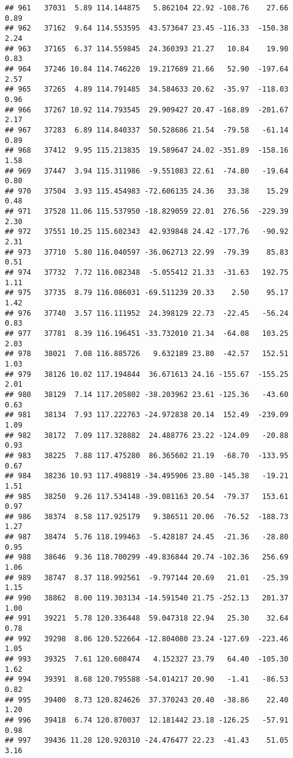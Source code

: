 \documentclass[]{article}
\begin{document}
\begin{verbatim}
## 961   37031  5.89 114.144875   5.862104 22.92 -108.76    27.66  0.89
## 962   37162  9.64 114.553595  43.573647 23.45 -116.33  -150.38  2.24
## 963   37165  6.37 114.559845  24.360393 21.27   10.84    19.90  0.83
## 964   37246 10.84 114.746220  19.217689 21.66   52.90  -197.64  2.57
## 965   37265  4.89 114.791485  34.584633 20.62  -35.97  -118.03  0.96
## 966   37267 10.92 114.793545  29.909427 20.47 -168.89  -201.67  2.17
## 967   37283  6.89 114.840337  50.528686 21.54  -79.58   -61.14  0.89
## 968   37412  9.95 115.213835  19.589647 24.02 -351.89  -158.16  1.58
## 969   37447  3.94 115.311986  -9.551083 22.61  -74.80   -19.64  0.80
## 970   37504  3.93 115.454983 -72.606135 24.36   33.38    15.29  0.48
## 971   37528 11.06 115.537950 -18.829059 22.01  276.56  -229.39  2.30
## 972   37551 10.25 115.602343  42.939848 24.42 -177.76   -90.92  2.31
## 973   37710  5.80 116.040597 -36.062713 22.99  -79.39    85.83  0.51
## 974   37732  7.72 116.082348  -5.055412 21.33  -31.63   192.75  1.11
## 975   37735  8.79 116.086031 -69.511239 20.33    2.50    95.17  1.42
## 976   37740  3.57 116.111952  24.398129 22.73  -22.45   -56.24  0.83
## 977   37781  8.39 116.196451 -33.732010 21.34  -64.08   103.25  2.03
## 978   38021  7.08 116.885726   9.632189 23.80  -42.57   152.51  1.03
## 979   38126 10.02 117.194844  36.671613 24.16 -155.67  -155.25  2.01
## 980   38129  7.14 117.205802 -38.203962 23.61 -125.36   -43.60  0.63
## 981   38134  7.93 117.222763 -24.972838 20.14  152.49  -239.09  1.09
## 982   38172  7.09 117.328882  24.488776 23.22 -124.09   -20.88  0.93
## 983   38225  7.88 117.475280  86.365602 21.19  -68.70  -133.95  0.67
## 984   38236 10.93 117.498819 -34.495906 23.80 -145.38   -19.21  1.51
## 985   38250  9.26 117.534148 -39.081163 20.54  -79.37   153.61  0.97
## 986   38374  8.58 117.925179   9.386511 20.06  -76.52  -188.73  1.27
## 987   38474  5.76 118.199463  -5.428187 24.45  -21.36   -28.80  0.95
## 988   38646  9.36 118.700299 -49.836844 20.74 -102.36   256.69  1.06
## 989   38747  8.37 118.992561  -9.797144 20.69   21.01   -25.39  1.15
## 990   38862  8.00 119.303134 -14.591540 21.75 -252.13   201.37  1.00
## 991   39221  5.78 120.336448  59.047318 22.94   25.30    32.64  0.78
## 992   39298  8.06 120.522664 -12.804080 23.24 -127.69  -223.46  1.05
## 993   39325  7.61 120.608474   4.152327 23.79   64.40  -105.30  1.62
## 994   39391  8.68 120.795588 -54.014217 20.90   -1.41   -86.53  0.82
## 995   39400  8.73 120.824626  37.370243 20.40  -38.86    22.40  1.20
## 996   39418  6.74 120.870037  12.181442 23.18 -126.25   -57.91  0.98
## 997   39436 11.28 120.920310 -24.476477 22.23  -41.43    51.05  3.16

\end{verbatim}
\end{document}
